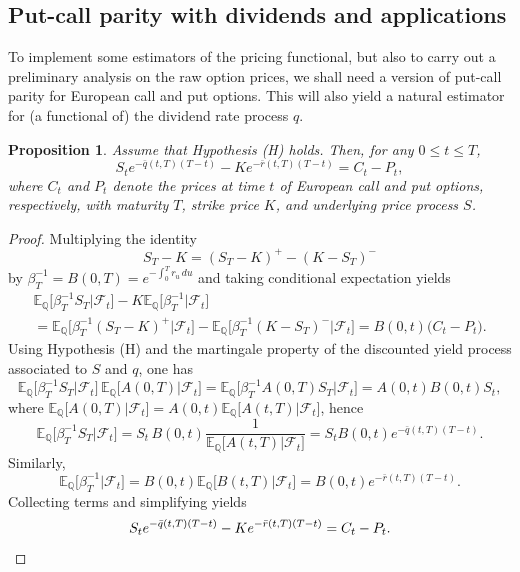 \documentclass[11pt]{article}
\newtheorem{prop}{Proposition}[section]
\theoremstyle{remark}
\newcommand{\E}{\mathbb{E}}
\newcommand{\cF}{\mathcal{F}}
\newcommand{\Q}{\mathbb{Q}}
\begin{document}
\subsection{Put-call parity with dividends and applications}
To implement some estimators of the pricing functional, but also to
carry out a preliminary analysis on the raw option prices, we shall
need a version of put-call parity for European call and put
options. This will also yield a natural estimator for (a functional
of) the dividend rate process $q$.
%
\begin{prop}   \label{prop:parity}
  Assume that Hypothesis \emph{(H)} holds. Then, for any
  $0 \leq t \leq T$,
  \begin{equation}   \label{eq:parity}
    S_t e^{-\bar{q}(t,T)(T-t)} - K e^{-\bar{r}(t,T)(T-t)} = C_t - P_t,
  \end{equation}
  where $C_t$ and $P_t$ denote the prices at time $t$ of European call
  and put options, respectively, with maturity $T$, strike price $K$,
  and underlying price process $S$.
\end{prop}
%
\begin{proof}
  Multiplying the identity 
  \[
  S_T-K = (S_T-K)^+ - (K-S_T)^-
  \]
  by $\beta_T^{-1} = B(0,T) = e^{-\int_0^T r_u\,du}$ and taking
  conditional expectation yields
  \begin{multline*}
    \E_\Q\bigl[\beta_T^{-1}S_T \big\vert \cF_t \bigr] 
    - K\E_\Q\bigl[\beta_T^{-1} \big\vert \cF_t \bigr] \\ 
     = \E_\Q \bigl[\beta_T^{-1} (S_T-K)^+ \big\vert \cF_t \bigr] 
      - \E_\Q \bigl[\beta_T^{-1} (K-S_T)^- \big\vert \cF_t \bigr]
     = B(0,t)\bigl( C_t - P_t \bigr).
  \end{multline*}
  Using Hypothesis (H) and the martingale property of the discounted yield
  process associated to $S$ and $q$, one has
  \[
  \E_\Q\bigl[\beta_T^{-1}S_T \big\vert \cF_t \bigr] \,
  \E_\Q\bigl[A(0,T) \big\vert \cF_t \bigr] = 
  \E_\Q\bigl[\beta_T^{-1} A(0,T) S_T \big\vert \cF_t \bigr]
  = A(0,t) B(0,t) S_t,
  \]
  where
  $\E_\Q\bigl[A(0,T) \big\vert \cF_t \bigr] = A(0,t) \E_\Q\bigl[A(t,T)
  \big\vert \cF_t \bigr]$, hence
  \[
  \E_\Q\bigl[\beta_T^{-1}S_T \big\vert \cF_t \bigr] = S_t \, B(0,t)
  \frac{1}{\E_\Q\bigl[A(t,T) \big\vert \cF_t \bigr]}
  = S_t B(0,t) e^{-\bar{q}(t,T)(T-t)}.
  \]
  Similarly,
  \[
  \E_\Q\bigl[\beta_T^{-1} \big\vert \cF_t \bigr] = 
  B(0,t) \E_\Q\bigl[B(t,T) \big\vert \cF_t \bigr] =
  B(0,t) e^{-\bar{r}(t,T)(T-t)}.
  \]
  Collecting terms and simplifying yields
  \[
  S_t e^{-\bar{q}(t,T)(T-t)} - K e^{-\bar{r}(t,T)(T-t)} = C_t - P_t.
  \qedhere
  \]
\end{proof}
\end{document}
